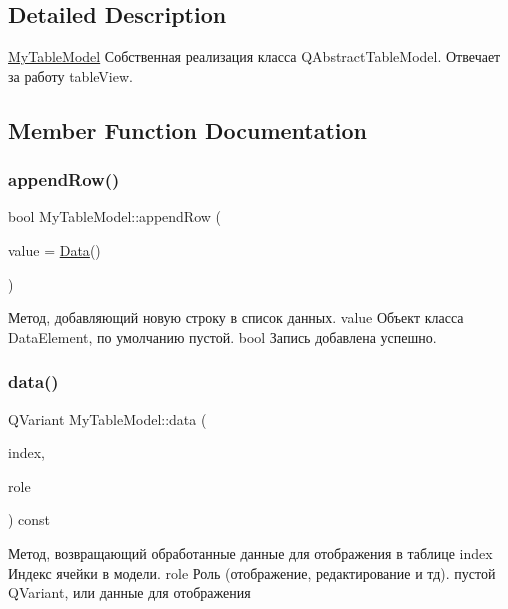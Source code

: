 \subsection{Detailed Description}
\mbox{\hyperlink{class_my_table_model}{My\+Table\+Model}} Собственная реализация класса Q\+Abstract\+Table\+Model. Отвечает за работу table\+View. 

\subsection{Member Function Documentation}
\mbox{\label{class_my_table_model_a2d1347632c07b69acbd208cc087d6397}} 
\subsubsection{\texorpdfstring{appendRow()}{appendRow()}}
{\footnotesize\ttfamily bool My\+Table\+Model\+::append\+Row (\begin{DoxyParamCaption}\item[{const \mbox{\hyperlink{class_data}{Data}} \&}]{value = {\ttfamily \mbox{\hyperlink{class_data}{Data}}()} }\end{DoxyParamCaption})}

Метод, добавляющий новую строку в список данных. value Объект класса Data\+Element, по умолчанию пустой. bool Запись добавлена успешно. \mbox{\label{class_my_table_model_affedfb28280a3ae512875ecfd8fad1e1}} 
\subsubsection{\texorpdfstring{data()}{data()}}
{\footnotesize\ttfamily Q\+Variant My\+Table\+Model\+::data (\begin{DoxyParamCaption}\item[{const Q\+Model\+Index \&}]{index,  }\item[{int}]{role }\end{DoxyParamCaption}) const\hspace{0.3cm}{\ttfamily [override]}}

Метод, возвращающий обработанные данные для отображения в таблице index Индекс ячейки в модели. role Роль (отображение, редактирование и тд). пустой Q\+Variant, или данные для отображения \mbox{\label{class_my_table_model_a87bc6c586fac3a1cb7248865144e9e15}} 
